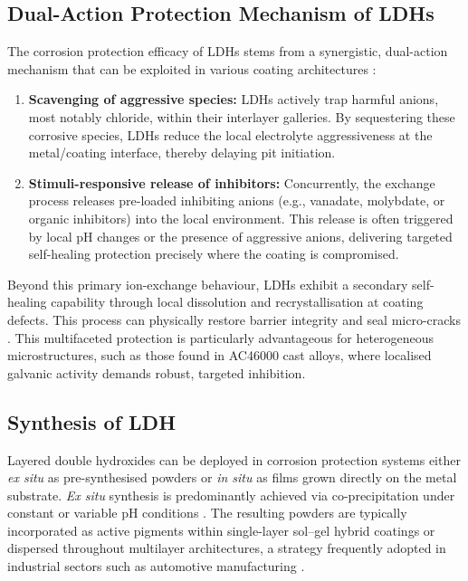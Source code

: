 \documentclass[11pt,twoside,a4paper,final]{report}
\begin{document}
\subsection{Dual-Action Protection Mechanism of LDHs}
\label{subsec:LDH_advantages}

The corrosion protection efficacy of LDHs stems from a synergistic, dual-action mechanism that can be exploited in various coating architectures \cite{Iuzviuk2020, He2020, Cao2022, Zhou2017, Bouali2020}:

\begin{enumerate}
    \item \textbf{Scavenging of aggressive species:} LDHs actively trap harmful anions, most notably chloride, within their interlayer galleries. By sequestering these corrosive species, LDHs reduce the local electrolyte aggressiveness at the metal/coating interface, thereby delaying pit initiation.
    
    \item \textbf{Stimuli-responsive release of inhibitors:} Concurrently, the exchange process releases pre-loaded inhibiting anions (e.g., vanadate, molybdate, or organic inhibitors) into the local environment. This release is often triggered by local pH changes or the presence of aggressive anions, delivering targeted self-healing protection precisely where the coating is compromised.
\end{enumerate}

Beyond this primary ion-exchange behaviour, LDHs exhibit a secondary self-healing capability through local dissolution and recrystallisation at coating defects. This process can physically restore barrier integrity and seal micro-cracks \cite{Cao2022}. This multifaceted protection is particularly advantageous for heterogeneous microstructures, such as those found in AC46000 cast alloys, where localised galvanic activity demands robust, targeted inhibition.

\subsection{Synthesis of LDH}
\label{subsec:LDH_synthesis}

Layered double hydroxides can be deployed in corrosion protection systems either \textit{ex situ} as pre-synthesised powders or \textit{in situ} as films grown directly on the metal substrate. \textit{Ex situ} synthesis is predominantly achieved via co-precipitation under constant or variable pH conditions \cite{BoualiReview2020}. The resulting powders are typically incorporated as active pigments within single-layer sol--gel hybrid coatings \cite{Yasakau2014, Alvarez2010} or dispersed throughout multilayer architectures, a strategy frequently adopted in industrial sectors such as automotive manufacturing \cite{BoualiReview2020}.
\end{document}
